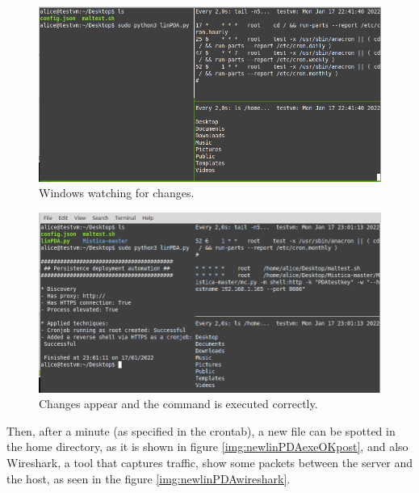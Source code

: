 \begin{figure}[!htb]
	\centering
	\includegraphics[width=14cm]{img/newlinPDA-watchexecuted}
	\caption{Windows watching for changes.}
	\label{img:newlinPDAwatch}
\end{figure}


\begin{figure}[!htb]
	\centering
	\includegraphics[width=14cm]{img/newlinPDA-executionOK}
	\caption{Changes appear and the command is executed correctly.}
	\label{img:newlinPDAexecuted}
\end{figure}

\pagebreak
Then, after a minute (as specified in the crontab), a new file can be spotted in the home directory, as it is shown in figure \ref{img:newlinPDAexeOKpost}, and also Wireshark, a tool that captures traffic, show some packets between the server and the host, as seen in the figure \ref{img:newlinPDAwireshark}.

